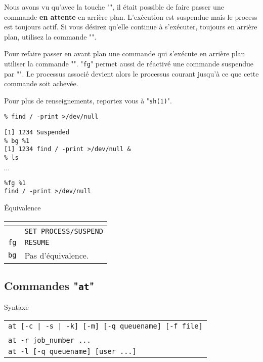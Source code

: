 Nous avons vu qu'avec la touche "", il {\'e}tait possible de
faire passer une commande \textbf{en attente} en arri{\`e}re plan. {\large
L'ex{\'e}cution est suspendue mais le process est toujours actif}. Si vous
d{\'e}sirez qu'elle continue {\`a} s'ex{\'e}cuter, toujours en arri{\`e}re plan,
utilisez la commande "".

Pour refaire passer en avant plan une commande qui s'ex{\'e}cute en arri{\`e}re
plan utiliser la commande "". "\texttt{fg}"
permet aussi de r{\'e}activ{\'e} une commande suspendue par "".
Le processus associ{\'e} devient alors le processus courant jusqu'{\`a} ce que
cette commande soit achev{\'e}e.

Pour plus de renseignements, reportez vous {\`a} "\texttt{sh(1)}".

\begin{example}
\begin{verbatim}
% find / -print >/dev/null
\end{verbatim}
\begin{verbatim}
[1] 1234 Suspended
% bg %1
[1] 1234 find / -print >/dev/null &
% ls
\end{verbatim}
$\cdots$\\
\begin{verbatim}
%fg %1
find / -print >/dev/null
\end{verbatim}
\end{example}

\begin{definition}{\'{E}quivalence}
\begin{tabular}{|l|l|}
	\hline
		\multicolumn{1}{|c|}{{\Unix}}	&
		\multicolumn{1}{|c|}{{\OpenVMS}}	\\
	\hline \hline
		\control{Z}	&	{\tt SET PROCESS/SUSPEND}	\\
	\hline
		{\tt fg}		&	{\tt RESUME}				\\
	\hline
		{\tt bg}		&	Pas d'{\'e}quivalence.			\\
	\hline
\end{tabular}
\end{definition}

\subsection{Commandes "{\tt at}"}

\begin{definition}{Syntaxe}
\begin{tabular}{@{\hspace{0.5cm}}l}
	{\tt at [-c | -s | -k] [-m] [-q queuename] [-f file]} \\
	\hspace{1cm}{\tt date [increment] [command | file]}\\[0.2cm]
	{\tt at -r job\_number ...}\\[0.2cm]
	{\tt at -l [-q queuename] [user ...]}\\[0.2cm]
\end{tabular}
\end{definition}

